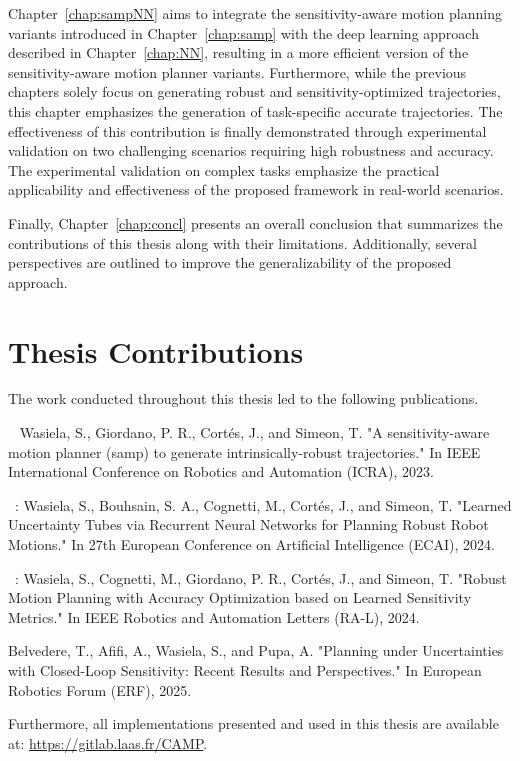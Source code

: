Chapter~\ref{chap:sampNN} aims to integrate the sensitivity-aware motion planning variants introduced in Chapter~\ref{chap:samp} with the deep learning approach described in Chapter~\ref{chap:NN}, resulting in a more efficient version of the sensitivity-aware motion planner variants.
Furthermore, while the previous chapters solely focus on generating robust and sensitivity-optimized trajectories, this chapter emphasizes the generation of task-specific accurate trajectories.
The effectiveness of this contribution is finally demonstrated through experimental validation on two challenging scenarios requiring high robustness and accuracy.
The experimental validation on complex tasks emphasize the practical applicability and effectiveness of the proposed framework in real-world scenarios.

Finally, Chapter~\ref{chap:concl} presents an overall conclusion that summarizes the contributions of this thesis along with their limitations.
Additionally, several perspectives are outlined to improve the generalizability of the proposed approach.

\section{Thesis Contributions}

The work conducted throughout this thesis led to the following publications. 

~\cite{cSAMP} Wasiela, S., Giordano, P. R., Cortés, J., and Simeon, T. "A sensitivity-aware motion planner (samp) to generate intrinsically-robust trajectories." In IEEE International Conference on Robotics and Automation (ICRA), 2023.

~\cite{cECAI}: Wasiela, S., Bouhsain, S. A., Cognetti, M., Cortés, J., and Simeon, T. "Learned Uncertainty Tubes via Recurrent Neural Networks for Planning Robust Robot Motions." In 27th European Conference on Artificial Intelligence (ECAI), 2024.

~\cite{cRAL}: Wasiela, S., Cognetti, M., Giordano, P. R., Cortés, J., and Simeon, T. "Robust Motion Planning with Accuracy Optimization based on Learned Sensitivity Metrics." In IEEE Robotics and Automation Letters (RA-L), 2024.

Belvedere, T., Afifi, A., Wasiela, S., and Pupa, A. "Planning under Uncertainties with Closed-Loop Sensitivity: Recent Results and Perspectives." In European Robotics Forum (ERF), 2025.

Furthermore, all implementations presented and used in this thesis are available at: \href{https://gitlab.laas.fr/CAMP}{https://gitlab.laas.fr/CAMP}.